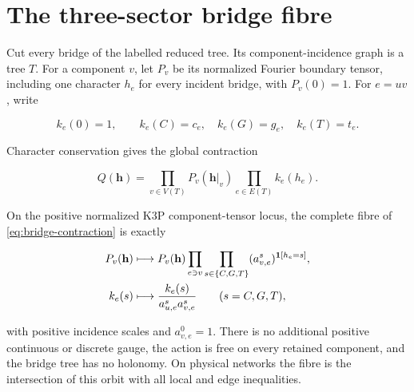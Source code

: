\section{The three-sector bridge fibre}\label{sec:bridge-fibre}

Cut every bridge of the labelled reduced tree.  Its component-incidence graph
is a tree \(T\).  For a component \(v\), let \(P_v\) be its normalized Fourier
boundary tensor, including one character \(h_e\) for every incident bridge,
with \(P_v(0)=1\).  For \(e=uv\), write

\[
 k_e(0)=1,\qquad k_e(C)=c_e,\quad k_e(G)=g_e,\quad k_e(T)=t_e.
\]

Character conservation gives the global contraction

\begin{equation}\label{eq:bridge-contraction}
 Q(\mathbf h)=
 \prod_{v\in V(T)}P_v(\mathbf h|_v)
 \prod_{e\in E(T)}k_e(h_e).
\end{equation}

\begin{theorem}
\label{thm:bridge-fibre}
On the positive normalized K3P component-tensor locus, the complete fibre of
\eqref{eq:bridge-contraction} is exactly

\begin{align}
 P_v(\mathbf h)&\longmapsto P_v(\mathbf h)
 \prod_{e\ni v}\prod_{s\in\{C,G,T\}}
 (a^s_{v,e})^{\mathbf 1[h_e=s]},\label{eq:bridge-action-component}\\
 k_e(s)&\longmapsto
 \frac{k_e(s)}{a^s_{u,e}a^s_{v,e}}
 \qquad(s=C,G,T),\label{eq:bridge-action-edge}
\end{align}

with positive incidence scales and \(a^0_{v,e}=1\).  There is no additional
positive continuous or discrete gauge, the action is free on every retained
component, and the bridge tree has no holonomy.  On physical networks the
fibre is the intersection of this orbit with all local and edge inequalities.
\end{theorem}

